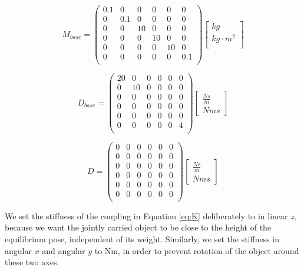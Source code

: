 \begin{equation}
M_{base} = \begin{pmatrix}
0.1 & 0 & 0 & 0 & 0 & 0 \\
0 & 0.1 & 0 & 0 & 0 & 0 \\
0 & 0 & 10 & 0 & 0 & 0 \\
0 & 0 & 0 & 10 & 0 & 0 \\
0 & 0 & 0 & 0 & 10 & 0 \\
0 & 0 & 0 & 0 & 0 & 0.1 \\
\end{pmatrix}
\begin{bmatrix}
kg \\
kg \cdot m^2 \\
\end{bmatrix}
\label{eq:M_base}
\end{equation}

\begin{equation}
D_{base} = \begin{pmatrix}
20 & 0 & 0 & 0 & 0 & 0 \\
0 & 10 & 0 & 0 & 0 & 0 \\
0 & 0 & 0 & 0 & 0 & 0 \\
0 & 0 & 0 & 0 & 0 & 0 \\
0 & 0 & 0 & 0 & 0 & 0 \\
0 & 0 & 0 & 0 & 0 & 4 \\
\end{pmatrix}
\begin{bmatrix}
\frac{N s}{m} \\
N m s
\end{bmatrix}
\label{eq:D_base}
\end{equation}

\begin{equation}
D = \begin{pmatrix}
0 & 0 & 0 & 0 & 0 & 0 \\
0 & 0 & 0 & 0 & 0 & 0 \\
0 & 0 & 0 & 0 & 0 & 0 \\
0 & 0 & 0 & 0 & 0 & 0 \\
0 & 0 & 0 & 0 & 0 & 0 \\
0 & 0 & 0 & 0 & 0 & 0 \\
\end{pmatrix}
\begin{bmatrix}
\frac{N s}{m} \\
N m s
\end{bmatrix}
\end{equation}

We set the stiffness of the coupling in Equation \ref{eq:K} deliberately to  in linear $z$, because we want the jointly carried object to be close to the height of the equilibrium pose, independent of its weight. Similarly, we set the stiffness in angular $x$ and angular $y$ to \unit[500]{Nm}, in order to prevent rotation of the object around these two axes.

